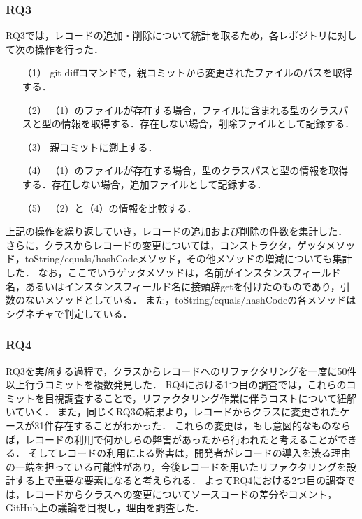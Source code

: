 \subsubsection{RQ3\label{rq3_method}}
RQ3では，レコードの追加・削除について統計を取るため，各レポジトリに対して次の操作を行った．
\begin{itemize}
    \item[（1） ] git diffコマンドで，親コミットから変更されたファイルのパスを取得する．
    \item[（2） ] （1）のファイルが存在する場合，ファイルに含まれる型のクラスパスと型の情報を取得する．存在しない場合，削除ファイルとして記録する．
    \item[（3） ] 親コミットに遡上する．
    \item[（4） ] （1）のファイルが存在する場合，型のクラスパスと型の情報を取得する．存在しない場合，追加ファイルとして記録する．
    \item[（5） ] （2）と（4）の情報を比較する．
\end{itemize}
上記の操作を繰り返していき，レコードの追加および削除の件数を集計した．
さらに，クラスからレコードの変更については，コンストラクタ，ゲッタメソッド，toString/equals/hashCodeメソッド，その他メソッドの増減についても集計した．
なお，ここでいうゲッタメソッドは，名前がインスタンスフィールド名，あるいはインスタンスフィールド名に接頭辞getを付けたのものであり，引数のないメソッドとしている．
また，toString/equals/hashCodeの各メソッドはシグネチャで判定している．

\subsubsection{RQ4\label{rq4_method}}
RQ3を実施する過程で，クラスからレコードへのリファクタリングを一度に50件以上行うコミットを複数発見した．
RQ4における1つ目の調査では，これらのコミットを目視調査することで，リファクタリング作業に伴うコストについて紐解いていく．
また，同じくRQ3の結果より，レコードからクラスに変更されたケースが31件存在することがわかった．
これらの変更は，もし意図的なものならば，レコードの利用で何かしらの弊害があったから行われたと考えることができる．
そしてレコードの利用による弊害は，開発者がレコードの導入を渋る理由の一端を担っている可能性があり，今後レコードを用いたリファクタリングを設計する上で重要な要素になると考えられる．
よってRQ4における2つ目の調査では，レコードからクラスへの変更についてソースコードの差分やコメント，GitHub上の議論を目視し，理由を調査した．